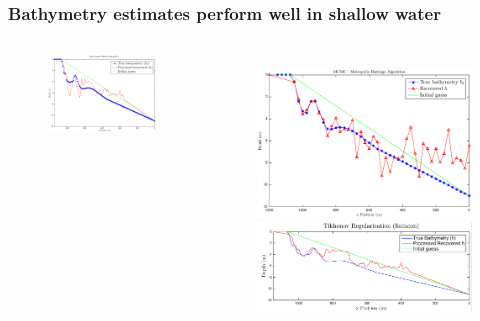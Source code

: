 \documentclass[7pt]{beamer}
\begin{document}
\begin{frame}
	\frametitle{Bathymetry estimates perform well in shallow water}
		\begin{columns}
				\begin{figure}[H]
	 				\centering
					\includegraphics[width=1\linewidth]{img/nllsq_real_1.eps}
				\end{figure}
				\begin{figure}[H]
	 				\includegraphics[width=1\linewidth]{img/MCMC-manufactured.eps}\vfill
					\includegraphics[width=1\linewidth]{img/fmincon_real_Oct09_nok.png}
	 			\end{figure}
		\end{columns}
\end{frame}
\end{document}
